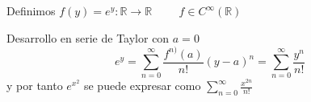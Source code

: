 
Definimos $f(y)=e^y:\mathbb{R}\rightarrow\mathbb{R} \hspace{1cm} f\in C^{\infty}(\mathbb{R})$

Desarrollo en serie de Taylor con $a=0$
\[ e^y = \sum_{n=0}^{\infty} \frac{f^{n)}(a)}{n!}(y-a)^n=
\sum_{n=0}^{\infty} \frac{y^n}{n!}
\] y por tanto $e^{x^2}$ se puede expresar como $\sum_{n=0}^{\infty} \frac{x^{2n}}{n!}$